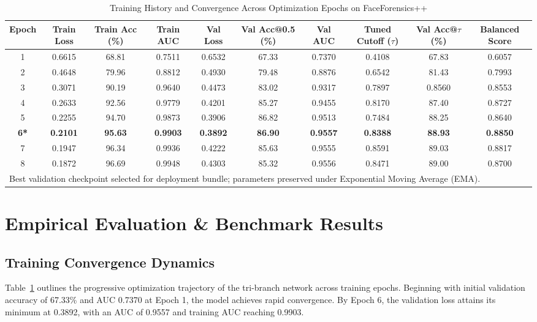 \documentclass[journal,10pt,twocolumn]{IEEEtran}
\begin{document}
\begin{table}[t]
\centering
\caption{Training History and Convergence Across Optimization Epochs on FaceForensics++}
\label{tab:training_history}
\begin{tabular}{cccccccccc}
\toprule
\textbf{Epoch} & \textbf{Train Loss} & \textbf{Train Acc (\%)} & \textbf{Train AUC} & \textbf{Val Loss} & \textbf{Val Acc@0.5 (\%)} & \textbf{Val AUC} & \textbf{Tuned Cutoff ($\tau$)} & \textbf{Val Acc@$\tau$ (\%)} & \textbf{Balanced Score} \\
\midrule
1 & 0.6615 & 68.81 & 0.7511 & 0.6532 & 67.33 & 0.7370 & 0.4108 & 67.83 & 0.6057 \\
2 & 0.4648 & 79.96 & 0.8812 & 0.4930 & 79.48 & 0.8876 & 0.6542 & 81.43 & 0.7993 \\
3 & 0.3071 & 90.19 & 0.9640 & 0.4473 & 83.02 & 0.9317 & 0.7897 & 0.8560 & 0.8553 \\
4 & 0.2633 & 92.56 & 0.9779 & 0.4201 & 85.27 & 0.9455 & 0.8170 & 87.40 & 0.8727 \\
5 & 0.2255 & 94.70 & 0.9873 & 0.3906 & 86.82 & 0.9513 & 0.7484 & 88.25 & 0.8640 \\
\textbf{6*} & \textbf{0.2101} & \textbf{95.63} & \textbf{0.9903} & \textbf{0.3892} & \textbf{86.90} & \textbf{0.9557} & \textbf{0.8388} & \textbf{88.93} & \textbf{0.8850} \\
7 & 0.1947 & 96.34 & 0.9936 & 0.4222 & 85.63 & 0.9555 & 0.8591 & 89.03 & 0.8817 \\
8 & 0.1872 & 96.69 & 0.9948 & 0.4303 & 85.32 & 0.9556 & 0.8471 & 89.00 & 0.8700 \\
\bottomrule
\multicolumn{10}{l}{\footnotesize *Best validation checkpoint selected for deployment bundle; parameters preserved under Exponential Moving Average (EMA).}
\end{tabular}
\end{table}

\section{Empirical Evaluation \& Benchmark Results}

\subsection{Training Convergence Dynamics}
Table~\ref{tab:training_history} outlines the progressive optimization trajectory of the tri-branch network across training epochs. Beginning with initial validation accuracy of 67.33\% and AUC 0.7370 at Epoch 1, the model achieves rapid convergence. By Epoch 6, the validation loss attains its minimum at 0.3892, with an AUC of 0.9557 and training AUC reaching 0.9903. 
\end{document}
